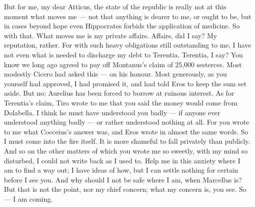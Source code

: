  But for me, my dear Atticus, the state of the republic is really not at this moment what moves me --- not that anything is dearer to me, or ought to be, but in cases beyond hope even Hippocrates forbids the application of medicine. So with that. What moves me is my private affairs. Affairs, did I say? My reputation, rather. For with such heavy obligations still outstanding to me, I have not even what is needed to discharge my debt to Terentia. Terentia, I say? You know we long ago agreed to pay off Montanus's claim of 25{,}000 sesterces. Most modestly Cicero had asked this --- on his honour. Most generously, as you yourself had approved, I had promised it, and had told Eros to keep the sum set aside. \dag{}But no\dag{}: Aurelius has been forced to borrow at ruinous interest. As for Terentia's claim, Tiro wrote to me that you said the money would come from Dolabella. I think he must have understood you badly --- if anyone ever understood anything badly --- or rather understood nothing at all. For you wrote to me what Cocceius's answer was, and Eros wrote in almost the same words. So I must come into the fire itself. It is more shameful to fall privately than publicly. And so on the other matters of which you wrote me so sweetly, with my mind so disturbed, I could not write back as I used to. \dag{}Help me in this anxiety where I am\dag{} to find a way out; I have ideas of how, but I can settle nothing for certain before I see you. And why should I not be safe where I am, when Marcellus is? But that is not the point, nor my chief concern; what my concern is, you see. So --- I am coming.
